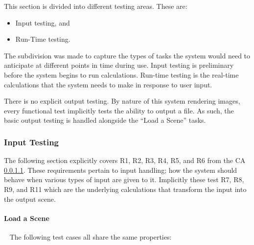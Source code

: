 \documentclass[12pt, titlepage]{article}
\begin{document}
This section is divided into different testing areas. These are:

\begin{itemize}
	\item Input testing, and
	\item Run-Time testing.
\end{itemize}

The subdivision was made to capture the types of tasks the system would need to 
anticipate at different points in time during use. Input testing is preliminary 
before the system begins to run calculations. Run-time testing is the real-time 
calculations that the system needs to make in response to user input.

There is no explicit output testing. By nature of this system rendering images, 
every functional test implicitly tests the ability to output a file. As such, 
the basic output testing is handled alongside the ``Load a Scene'' tasks.

%

\subsubsection{Input Testing}
The following section explicitly covers R1, R2, R3, R4, R5, and R6  from the CA 
\ref{}.   These requirements pertain to input handling; how the system should 
behave when various types of input are given to it. Implicitly these test R7, 
R8, R9, and R11 which are the underlying calculations that transform the input 
into the output scene.

		
\paragraph{Load a Scene}
~\newline
The following test cases all share the same properties:
\end{document}
